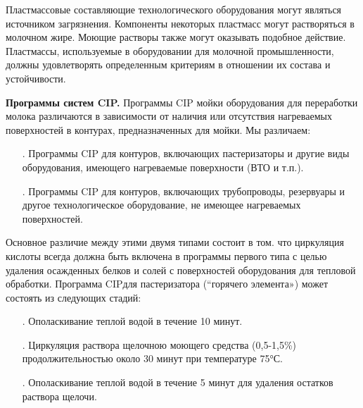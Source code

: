 {\par \redline Пластмассовые составляющие технологического оборудования могут являться источником загрязнения. Компоненты некоторых пластмасс могут растворяться в молочном жире. Моющие растворы также могут оказывать подобное действие. Пластмассы, используемые в оборудовании для молочной промышленности, должны удовлетворять определенным критериям в отношении их состава и устойчивости.


\par \redline \textbf{Программы систем CIP.} Программы CIP мойки оборудования для переработки молока различаются в зависимости от наличия или отсутствия нагреваемых поверхностей в контурах, предназначенных для мойки. Мы различаем:

\begin{itemize}[leftmargin=2.15cm, labelwidth=0.65cm, labelsep=0.0cm] 
	
	\item[\theitemcntr. ] Программы CIP для контуров, включающих пастеризаторы и другие виды оборудования, имеющего нагреваемые поверхности (ВТО и т.п.).
	\addtocounter{itemcntr}{1}
	
	\item[\theitemcntr. ] Программы CIP для контуров, включающих трубопроводы, резервуары и другое технологическое оборудование, не имеющее нагреваемых поверхностей.
	\addtocounter{itemcntr}{1}
	
	\setcounter{itemcntr}{1}
\end{itemize}

\par \redline Основное различие между этими двумя типами состоит в том. что циркуляция кислоты всегда должна быть включена в программы первого типа с целью удаления осажденных белков и солей с поверхностей оборудования для тепловой обработки. Программа CIPдля пастеризатора (“горячего элемента») может состоять из следующих стадий:

\begin{itemize}[leftmargin=2.15cm, labelwidth=0.65cm, labelsep=0.0cm] 
	
	\item[\theitemcntr. ] Ополаскивание теплой водой в течение 10 минут.
	\addtocounter{itemcntr}{1}
	
	\item[\theitemcntr. ] Циркуляция раствора щелочною моющего средства (0,5-1,5\%) продолжительностью около 30 минут при температуре 75°С.
	\addtocounter{itemcntr}{1}
	
	\item[\theitemcntr. ] Ополаскивание теплой водой в течение 5 минут для удаления остатков раствора щелочи.
	\addtocounter{itemcntr}{1}
	

\end{itemize}}
